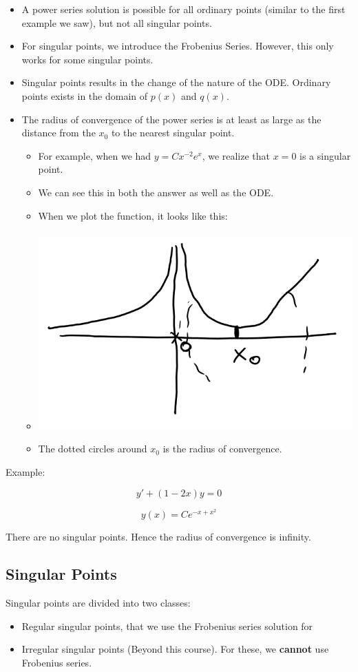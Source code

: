 \documentclass{article}
\begin{document}
\begin{itemize}
    \item A power series solution is possible for all ordinary points (similar to the first example we saw), but not all singular points. 
    \item For singular points, we introduce the Frobenius Series. However, this only works for some singular points. 
    \item Singular points results in the change of the nature of the ODE. Ordinary points exists in the domain of $p(x)$ and $q(x)$. 
    \item The radius of convergence of the power series is at least as large as the distance from the $x_0$ to the nearest singular point.
    \begin{itemize}
        \item For example, when we had $y = C x^{-2} e^x$, we realize that $x=  0$ is a singular point. 
        \item We can see this in both the answer as well as the ODE. \item When we plot the function, it looks like this:
        \item \includegraphics[width = 0.5 \textwidth]{image6.png}
        \item The dotted circles around $x_0$ is the radius of convergence. 
    \end{itemize}
\end{itemize}

Example:

$$y' + (1 - 2x)y =0$$

$$y(x) = C e^{-x + x^2}$$

There are no singular points. Hence the radius of convergence is infinity. 

\subsection{Singular Points}

Singular points are divided into two classes:

\begin{itemize}
    \item Regular singular points, that we use the Frobenius series solution for
    \item Irregular singular points (Beyond this course). For these, we \textbf{cannot} use Frobenius series. 
\end{itemize}
\end{document}
